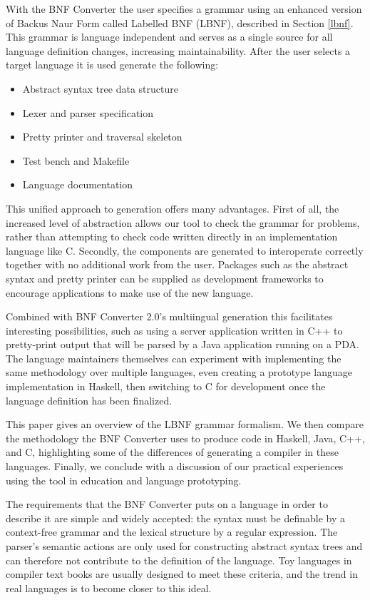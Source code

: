 With the BNF Converter the user specifies a grammar using an enhanced
version of Backus Naur Form called Labelled BNF (LBNF), described in
Section \ref{lbnf}. This grammar is language independent and serves as a
single source for all language definition changes, increasing
maintainability. After the user selects a target language it is used
generate the following:

\begin{itemize}
\item Abstract syntax tree data structure
\item Lexer and parser specification
\item Pretty printer and traversal skeleton
\item Test bench and Makefile
\item Language documentation
\end{itemize}

This unified approach to generation offers many advantages. First of all,
the increased level of abstraction allows our tool to check the grammar
for problems, rather than attempting to check code written directly in an
implementation language like C. Secondly, the components are generated to
interoperate correctly together with no additional work from the user.
Packages such as the abstract syntax and pretty printer can be supplied as
development frameworks to encourage applications to make use of the new
language.

Combined with BNF Converter 2.0's multiingual generation this facilitates
interesting possibilities, such as using a server application written in
C++ to pretty-print output that will be parsed by a Java application
running on a PDA. The language maintainers themselves can experiment with
implementing the same methodology over multiple languages, even creating a
prototype language implementation in Haskell, then switching to C for
development once the language definition has been finalized.


This paper gives an overview of the LBNF grammar formalism. We then
compare the methodology the BNF Converter uses to produce code in Haskell,
Java, C++, and C, highlighting some of the differences of generating a
compiler in these languages. Finally, we conclude with a discussion of our
practical experiences using the tool in education and language
prototyping.



The requirements that the BNF Converter puts on a language in order to
describe it are simple and widely accepted: the syntax must be definable
by a context-free grammar and the lexical structure by a regular expression.
The parser's semantic actions are only used for constructing abstract
syntax trees and can therefore not contribute to the definition of
the language.
Toy languages in compiler text books are usually designed to meet these
criteria, and the trend in real languages is to become closer to this ideal.

